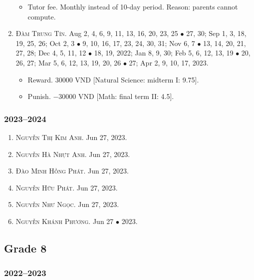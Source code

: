\documentclass{article}
\begin{document}
\begin{enumerate}
	\begin{itemize}
		\item {\sf Tutor fee.} Monthly instead of 10-day period. Reason: parents cannot compute.
	\end{itemize}
	\item \textsc{Đàm Trung Tín.} {\sf[In]} Aug 2, 4, 6, 9, 11, 13, 16, 20, 23, 25 $\bullet$ 27, 30; Sep 1, 3, 18, 19, 25, 26; Oct 2, 3 $\bullet$ 9, 10, 16, 17, 23, 24, 30, 31; Nov 6, 7 $\bullet$ 13, 14, 20, 21, 27, 28; Dec 4, 5, 11, 12 $\bullet$ 18, 19, 2022; Jan 8, 9, 30; Feb 5, 6, 12, 13, 19 $\bullet$ 20, 26, 27; Mar 5, 6, 12, 13, 19, 20, 26 $\bullet$ 27; Apr 2, 9, 10, 17, 2023. {\sf[Out]}
	\begin{itemize}
		\item {\sf Reward.} 30000 VND [Natural Science: midterm I: 9.75].
		\item {\sf Punish.} $-30000$ VND [Math: final term II: 4.5].
	\end{itemize}
\end{enumerate}

\subsubsection{2023--2024}
 
\begin{enumerate}
	\item \textsc{Nguyễn Thị Kim Anh.} {\sf[In]} Jun 27, 2023.
	\item \textsc{Nguyễn Hà Nhựt Anh.} {\sf[In]} Jun 27, 2023.
	\item \textsc{Đào Minh Hồng Phát.} {\sf[In]} Jun 27, 2023.
	\item \textsc{Nguyễn Hữu Phát.} {\sf[In]} Jun 27, 2023.
	\item \textsc{Nguyễn Như Ngọc.} {\sf[In]} Jun 27, 2023.
	\item \textsc{Nguyễn Khánh Phương.} {\sf[In]} Jun 27 $\bullet$ 2023.
\end{enumerate}


\subsection{Grade 8}

\subsubsection{2022--2023}
\end{document}
